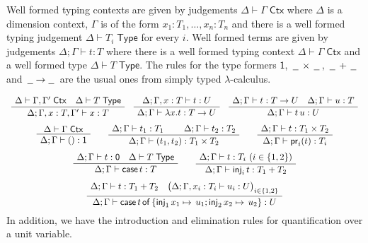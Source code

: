 \documentclass[a4paper,UKenglish]{lipics}
\newcommand{\ra}{\rightarrow}
\newcommand{\msf}[1]{\mathsf{#1}} %
\newcommand{\blank}{\, \underline{\hspace{2mm}} \,}
\newcommand{\unitTy}{\msf{1}}
\newcommand{\emptyTy}{\msf{0}}
\newcommand{\cj}[2]{#1 \vdash #2 \; \msf{ Ctx}}
\newcommand{\Tj}[2]{#1 \vdash #2 \; \msf{ Type}}
\newcommand{\tj}[4]{#1;#2 \vdash #3 : #4}
\newcommand{\proj}{\mathsf{pr}}
\newcommand{\inj}{\mathsf{inj}}
\newcommand{\emptyelim}{\mathsf{case}\,}
\newcommand{\case}[5]{\mathsf{case}\,#1\,\mathsf{of}\,\{\inj_1\,#2 \mapsto\,#3; \inj_2\,#4\mapsto\,#5\}}
\begin{document}
\vspace{3mm}  Well formed typing contexts are given by judgements
$\cj\Delta\Gamma $ where $\Delta$ is a dimension context, $\Gamma$ is
of the form ${x_1 : T_1, \ldots, x_n:T_n}$ and there is a well formed
typing judgement $\Tj\Delta{ T_i}$ for every $i$. Well formed terms
are given by judgements $\tj \Delta \Gamma t T$ where there is a
well formed typing context $\cj \Delta \Gamma$ and
a well formed type $\Tj \Delta T $. The rules for
the type formers $\unitTy$, $\blank\times\blank$, $\blank+\blank$ and $\blank \! \ra \! \blank$ are the usual ones from
simply typed $\lambda$-calculus.

\[\begin{array}{c}%
\AxiomC{%
$\cj \Delta{\Gamma,\Gamma'}\quad
\Tj\Delta T$}
\UnaryInfC
{$\tj \Delta{\Gamma,x:T,\Gamma'}xT$}
\DisplayProof
\quad
\AxiomC{%
$
\tj\Delta {\Gamma,x:T} {t}{U}
$%
}
\UnaryInfC
{$\tj\Delta {\Gamma} {\lambda x.t}{T\to U}$}
\DisplayProof
\quad
\AxiomC{%
$
\tj\Delta {\Gamma} {t}{T\to U}\quad
\tj\Delta {\Gamma} {u}{T}
$%
}
\UnaryInfC
{$\tj \Delta{\Gamma}{t\,u}U$}
\DisplayProof
\\[5mm]
\AxiomC{%
$\cj\Delta {\Gamma}
$%
}
\UnaryInfC
{$\tj \Delta{\Gamma}{()}\unitTy$}
\DisplayProof
\qquad
\AxiomC{$\tj\Delta {\Gamma} {t_1}{T_1}$}
\AxiomC{$\tj\Delta {\Gamma} {t_2}{T_2}$}
\BinaryInfC
{$\tj \Delta{\Gamma}{(t_1,t_2)}{T_1\times T_2}$}
\DisplayProof
\qquad
\AxiomC{%
$
\tj\Delta {\Gamma} {t}{T_1\times T_2}
$%
}
\UnaryInfC
{$\tj\Delta {\Gamma} {\proj_i(t)}{T_i}$}
\DisplayProof
\\[5mm]
\AxiomC{%
$
\tj\Delta {\Gamma} {t}{\emptyTy}
\quad \Tj\Delta T$%
}
\UnaryInfC
{$\tj\Delta {\Gamma} {\emptyelim t}{T}$}
\DisplayProof
\qquad
\AxiomC{%
$
\tj\Delta {\Gamma} {t}{T_i}
\ (i\in\{1,2\})$}
\UnaryInfC
{$\tj\Delta {\Gamma} {\inj_i\,t}{T_1 + T_2}$}
\DisplayProof
\\[5mm]
\AxiomC{$\tj\Delta {\Gamma} {t}{T_1 + T_2}
\quad \big(\tj\Delta {\Gamma, x_i : T_i} {u_i}{U}\big)_{i\in\{1,2\}}$}
\UnaryInfC
{$\tj\Delta {\Gamma} {\case{t}{x_1}{u_1}{x_2}{u_2}}{U}$}
\DisplayProof
\end{array}\]
%
In addition, we have the introduction and elimination rules for quantification over a unit variable.
\end{document}
